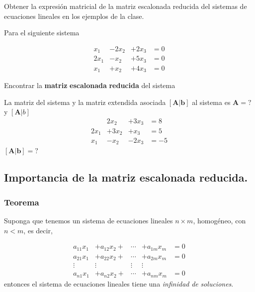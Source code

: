 \documentclass[
]{article}
\begin{document}
\small

Obtener la expresión matricial de la matriz escalonada reducida del
sistemas de ecuaciones lineales en los ejemplos de la clase.

Para el siguiente sistema

\begin{equation*}
  \begin{matrix}
      x_1   & -2 x_2  & +2 x_3  & = 0  \\
      2 x_1 &  - x_2  & +5 x_3  & = 0 \\
      x_1   &  + x_2  & +4 x_3  & = 0 
  \end{matrix}
\end{equation*}

Encontrar la \textbf{matriz} \textbf{escalonada} \textbf{reducida} del
sistema

La matriz del sistema y la matriz extendida asociada
\([\mathbf{A}|\mathbf{b}]\) al sistema es \(\mathbf{A}= ?\) y
\([\mathbf{A}|b]\) \begin{equation*}
  \begin{matrix}
            &  2 x_2 &+ 3 x_3  & = 8  \\
     2 x_1  & + 3x_2 & +  x_3  & = 5   \\
      x_1   &  -x_2  &  -2 x_3  & =-5
  \end{matrix}
\end{equation*} \([\mathbf{A} | \mathbf{b}] =?\)

\hypertarget{importancia-de-la-matriz-escalonada-reducida.}{%
\subsection{Importancia de la matriz escalonada
reducida.}\label{importancia-de-la-matriz-escalonada-reducida.}}

\hypertarget{teorema-2}{%
\subsubsection{Teorema}\label{teorema-2}}

Suponga que tenemos un sistema de ecuaciones lineales \(n\times m\),
homogéneo, con \(n<m\), es decir,

\begin{equation}
  \begin{matrix}
     a_{11} x_1 & +a_{12} x_2 + & \cdots   & +a_{1m} x_m  &= 0  \\
     a_{21} x_1 & +a_{22} x_2 + & \cdots   & +a_{2m} x_m  &= 0  \\
    \vdots    & \vdots  & \vdots   & \vdots \\
     a_{n1} x_1 & +a_{n2} x_2 + & \cdots   & +a_{nm} x_m  &= 0
  \end{matrix}
\end{equation} entonces el sistema de ecuaciones lineales tiene una
\emph{infinidad} \emph{de} \emph{soluciones}.
\end{document}
